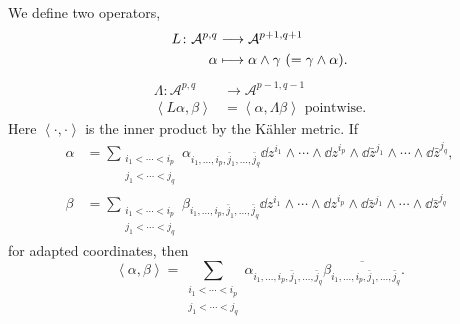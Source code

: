 \documentclass[12pt]{article}
\begin{document}
\begin{definition}
  We define two operators,
  \begin{align*}
    L\colon \mathcal{A}^{p,q}&\longrightarrow\mathcal{A}^{p+1,q+1} \\
    \alpha &\longmapsto \alpha\wedge \gamma\ (=\gamma\wedge \alpha)
  .\end{align*}
  \begin{align*}
    \Lambda\colon \mathcal{A}^{p,q} &\longrightarrow \mathcal{A}^{p-1,q-1} \\
    \left<L\alpha,\beta\right> &=\left<\alpha,\Lambda\beta\right> \text{ pointwise}
  .\end{align*}
  Here \(\left<\cdot,\cdot\right> \) is the inner product by the K\"ahler metric. If
  \begin{align*}
    \alpha &=\sum_{\substack{i_1<\cdots<i_p\\ j_1<\cdots<j_q}}
    \alpha_{i_1,\ldots,i_p,\bar{j}_1,\ldots,\bar{j}_q}\dd{z^{i_1}}\wedge\cdots 
    \wedge\dd{z^{i_p}}\wedge\dd{\bar{z}^{j_1}}\wedge\cdots\wedge\dd{\bar{z}^{j_q}}, \\
    \beta &=\sum_{\substack{i_1<\cdots<i_p\\ j_1<\cdots<j_q}}
    \beta_{i_1,\ldots,i_p,\bar{j}_1,\ldots,\bar{j}_q}\dd{z^{i_1}}\wedge\cdots 
    \wedge\dd{z^{i_p}}\wedge\dd{\bar{z}^{j_1}}\wedge\cdots\wedge\dd{\bar{z}^{j_q}}
  \end{align*}
  for adapted coordinates, then \[
    \left<\alpha,\beta\right> =\sum_{\substack{i_1<\cdots <i_p\\ j_1<\cdots <j_q}}
    \alpha_{i_1,\ldots,i_p,\bar{j}_1,\ldots,\bar{j}_q}\overline{\beta_{i_1,\ldots,i_p,
    \bar{j}_1,\ldots,\bar{j}_q}}
  .\] 
\end{definition}
\end{document}
